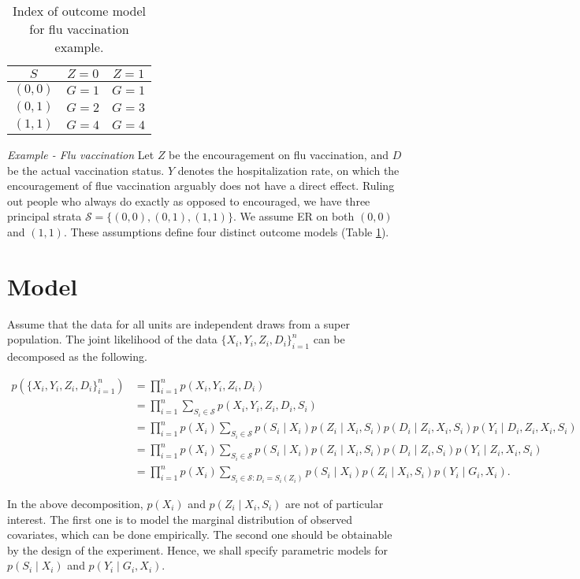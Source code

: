 \documentclass{article}
\begin{document}
\begin{table}[h]
  \centering
  \begin{tabular}{ccc}
    \toprule 
    $S$ & $Z = 0$ & $Z = 1$ \\
    \midrule
    $(0, 0)$ & $G = 1$ & $G = 1$ \\
    $(0, 1)$ & $G = 2$ & $G = 3$ \\
    $(1, 1)$ & $G = 4$ & $G = 4$ \\
    \bottomrule
  \end{tabular}
  \caption{Index of outcome model for flu vaccination example.}
  \label{tbl::fluvac}
\end{table}

\emph{Example - Flu vaccination} Let $Z$ be the encouragement on flu vaccination, and $D$ be the actual vaccination status. $Y$ denotes the hospitalization rate, on which the encouragement of flue vaccination arguably does not have a direct effect. Ruling out people who always do exactly as opposed to encouraged, we have three principal strata $\mathcal{S} = \{(0, 0), (0, 1), (1, 1)\}$. We assume ER on both $(0, 0)$ and $(1, 1)$. These assumptions define four distinct outcome models (Table \ref{tbl::fluvac}). 

\section{Model}
Assume that the data for all units are independent draws from a super population. The joint likelihood of the data $\{X_i, Y_i, Z_i, D_i\}_{i = 1}^n$ can be decomposed as the following.

$$\begin{aligned}
  p(\{X_i, Y_i, Z_i, D_i\}_{i = 1}^n) &= \prod_{i=1}^n p(X_i, Y_i, Z_i, D_i) \\
  &= \prod_{i=1}^n \sum_{S_i\in\mathcal{S}} p(X_i, Y_i, Z_i, D_i, S_i) \\
  &= \prod_{i=1}^n p(X_i)\sum_{S_i\in \mathcal{S}}p(S_i\mid X_i) p(Z_i\mid X_i, S_i)p(D_i \mid Z_i, X_i, S_i) p(Y_i\mid D_i, Z_i, X_i, S_i) \\
  &= \prod_{i=1}^n p(X_i)\sum_{S_i\in \mathcal{S}}p(S_i\mid X_i) p(Z_i\mid X_i, S_i)p(D_i \mid Z_i, S_i) p(Y_i\mid Z_i, X_i, S_i) \\
  &= \prod_{i=1}^n p(X_i)\sum_{S_i\in \mathcal{S}: D_i = S_i(Z_i)}p(S_i\mid X_i) p(Z_i\mid X_i, S_i)p(Y_i\mid G_i, X_i).
\end{aligned}$$

In the above decomposition, $p(X_i)$ and $p(Z_i\mid X_i, S_i)$ are not of particular interest. The first one is to model the marginal distribution of observed covariates, which can be done empirically. The second one should be obtainable by the design of the experiment. Hence, we shall specify parametric models for $p(S_i\mid X_i)$ and $p(Y_i\mid G_i, X_i)$.
\end{document}
